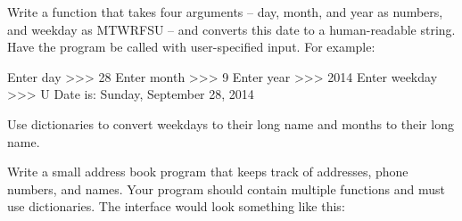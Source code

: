 \documentclass[11pt]{cselabheader}
\begin{document}
\begin{ex}[days.py] Write a function that takes four arguments -- day, month, and
    year as numbers, and weekday as MTWRFSU -- and converts this date to a
    human-readable string. Have the program be called with user-specified
    input. For example:

    \begin{verbatimcode}
Enter day >>> 28
Enter month >>> 9
Enter year >>> 2014
Enter weekday >>> U
Date is: Sunday, September 28, 2014
    \end{verbatimcode}

    Use dictionaries to convert weekdays to their long name and months to their
    long name.
\end{ex}

\begin{ex}[addresses.py]
  Write a small address book program that keeps track of addresses, phone
  numbers, and names. Your program should contain multiple functions and must
  use dictionaries. The interface would look something like this:

\begin{verbatimcode}

\end{verbatimcode}
\end{ex}


%
\end{document}
